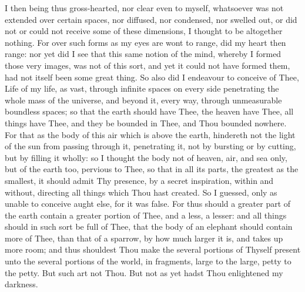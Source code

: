 \documentclass[b5paper,openright,12pt,twoside]{book}
\begin{document}
I then being thus gross-hearted, nor clear even to myself, whatsoever
was not extended over certain spaces, nor diffused, nor condensed, nor
swelled out, or did not or could not receive some of these dimensions,
I thought to be altogether nothing. For over such forms as my eyes are
wont to range, did my heart then range: nor yet did I see that this same
notion of the mind, whereby I formed those very images, was not of this
sort, and yet it could not have formed them, had not itself been some
great thing. So also did I endeavour to conceive of Thee, Life of my
life, as vast, through infinite spaces on every side penetrating
the whole mass of the universe, and beyond it, every way, through
unmeasurable boundless spaces; so that the earth should have Thee, the
heaven have Thee, all things have Thee, and they be bounded in Thee, and
Thou bounded nowhere. For that as the body of this air which is above
the earth, hindereth not the light of the sun from passing through it,
penetrating it, not by bursting or by cutting, but by filling it wholly:
so I thought the body not of heaven, air, and sea only, but of the earth
too, pervious to Thee, so that in all its parts, the greatest as the
smallest, it should admit Thy presence, by a secret inspiration, within
and without, directing all things which Thou hast created. So I guessed,
only as unable to conceive aught else, for it was false. For thus should
a greater part of the earth contain a greater portion of Thee, and a
less, a lesser: and all things should in such sort be full of Thee,
that the body of an elephant should contain more of Thee, than that of
a sparrow, by how much larger it is, and takes up more room; and thus
shouldest Thou make the several portions of Thyself present unto the
several portions of the world, in fragments, large to the large,
petty to the petty. But such art not Thou. But not as yet hadst Thou
enlightened my darkness.
\end{document}
